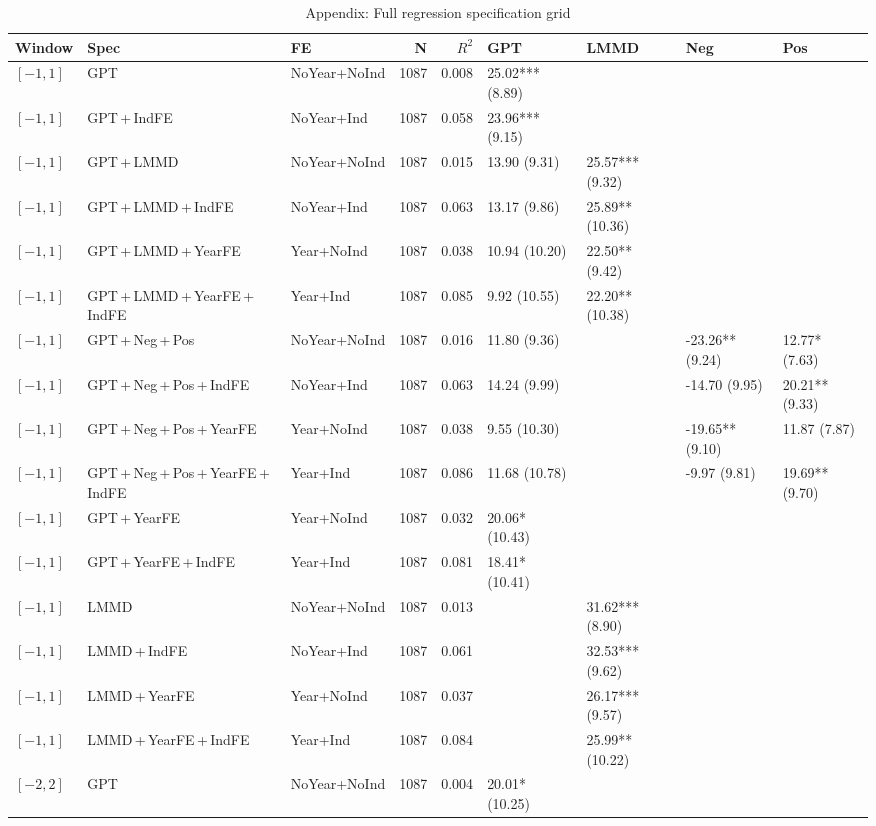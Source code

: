 \begin{table}[p]
\centering
\caption{Appendix: Full regression specification grid}
\label{tab:car_sentiment_appendix_dump}
\scriptsize
\begin{tabular}{lllrrllll}
\toprule
Window & Spec & FE & N & $R^{2}$ & GPT & LMMD & Neg & Pos \\
\midrule
$[-1,1]$ & GPT & NoYear+NoInd & 1087 & 0.008 & 25.02*** (8.89) &  &  &  \\
$[-1,1]$ & GPT\,+\,IndFE & NoYear+Ind & 1087 & 0.058 & 23.96*** (9.15) &  &  &  \\
$[-1,1]$ & GPT\,+\,LMMD & NoYear+NoInd & 1087 & 0.015 & 13.90 (9.31) & 25.57*** (9.32) &  &  \\
$[-1,1]$ & GPT\,+\,LMMD\,+\,IndFE & NoYear+Ind & 1087 & 0.063 & 13.17 (9.86) & 25.89** (10.36) &  &  \\
$[-1,1]$ & GPT\,+\,LMMD\,+\,YearFE & Year+NoInd & 1087 & 0.038 & 10.94 (10.20) & 22.50** (9.42) &  &  \\
$[-1,1]$ & GPT\,+\,LMMD\,+\,YearFE\,+\,IndFE & Year+Ind & 1087 & 0.085 & 9.92 (10.55) & 22.20** (10.38) &  &  \\
$[-1,1]$ & GPT\,+\,Neg\,+\,Pos & NoYear+NoInd & 1087 & 0.016 & 11.80 (9.36) &  & -23.26** (9.24) & 12.77* (7.63) \\
$[-1,1]$ & GPT\,+\,Neg\,+\,Pos\,+\,IndFE & NoYear+Ind & 1087 & 0.063 & 14.24 (9.99) &  & -14.70 (9.95) & 20.21** (9.33) \\
$[-1,1]$ & GPT\,+\,Neg\,+\,Pos\,+\,YearFE & Year+NoInd & 1087 & 0.038 & 9.55 (10.30) &  & -19.65** (9.10) & 11.87 (7.87) \\
$[-1,1]$ & GPT\,+\,Neg\,+\,Pos\,+\,YearFE\,+\,IndFE & Year+Ind & 1087 & 0.086 & 11.68 (10.78) &  & -9.97 (9.81) & 19.69** (9.70) \\
$[-1,1]$ & GPT\,+\,YearFE & Year+NoInd & 1087 & 0.032 & 20.06* (10.43) &  &  &  \\
$[-1,1]$ & GPT\,+\,YearFE\,+\,IndFE & Year+Ind & 1087 & 0.081 & 18.41* (10.41) &  &  &  \\
$[-1,1]$ & LMMD & NoYear+NoInd & 1087 & 0.013 &  & 31.62*** (8.90) &  &  \\
$[-1,1]$ & LMMD\,+\,IndFE & NoYear+Ind & 1087 & 0.061 &  & 32.53*** (9.62) &  &  \\
$[-1,1]$ & LMMD\,+\,YearFE & Year+NoInd & 1087 & 0.037 &  & 26.17*** (9.57) &  &  \\
$[-1,1]$ & LMMD\,+\,YearFE\,+\,IndFE & Year+Ind & 1087 & 0.084 &  & 25.99** (10.22) &  &  \\
$[-2,2]$ & GPT & NoYear+NoInd & 1087 & 0.004 & 20.01* (10.25) &  &  &  \\

\end{tabular}
\end{table}
